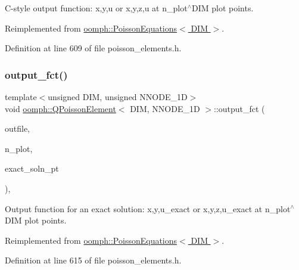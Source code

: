 C-\/style output function\+: x,y,u or x,y,z,u at n\+\_\+plot$^\wedge$\+D\+IM plot points. 



Reimplemented from \hyperlink{classoomph_1_1PoissonEquations_abc30eee5faaa50a65b272012d17ba604}{oomph\+::\+Poisson\+Equations$<$ D\+I\+M $>$}.



Definition at line 609 of file poisson\+\_\+elements.\+h.

\mbox{\label{classoomph_1_1QPoissonElement_a42738c2ce76bf1abc782c51b6c775904}} 
\subsubsection{\texorpdfstring{output\+\_\+fct()}{output\_fct()}\hspace{0.1cm}{\footnotesize\ttfamily [1/2]}}
{\footnotesize\ttfamily template$<$unsigned D\+IM, unsigned N\+N\+O\+D\+E\+\_\+1D$>$ \\
void \hyperlink{classoomph_1_1QPoissonElement}{oomph\+::\+Q\+Poisson\+Element}$<$ D\+IM, N\+N\+O\+D\+E\+\_\+1D $>$\+::output\+\_\+fct (\begin{DoxyParamCaption}\item[{std\+::ostream \&}]{outfile,  }\item[{const unsigned \&}]{n\+\_\+plot,  }\item[{\hyperlink{classoomph_1_1FiniteElement_a690fd33af26cc3e84f39bba6d5a85202}{Finite\+Element\+::\+Steady\+Exact\+Solution\+Fct\+Pt}}]{exact\+\_\+soln\+\_\+pt }\end{DoxyParamCaption})\hspace{0.3cm}{\ttfamily [inline]}, {\ttfamily [virtual]}}



Output function for an exact solution\+: x,y,u\+\_\+exact or x,y,z,u\+\_\+exact at n\+\_\+plot$^\wedge$\+D\+IM plot points. 



Reimplemented from \hyperlink{classoomph_1_1PoissonEquations_ad6c637c8a5221313c2220e8e8c27ec42}{oomph\+::\+Poisson\+Equations$<$ D\+I\+M $>$}.



Definition at line 615 of file poisson\+\_\+elements.\+h.

